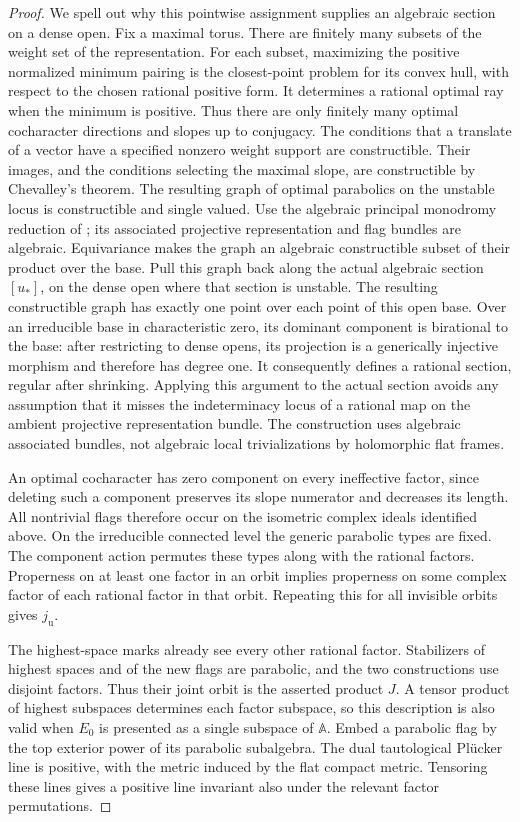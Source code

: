 \begin{proof}
We spell out why this pointwise assignment supplies an algebraic
section on a dense open.  Fix a maximal torus.  There are finitely
many subsets of the weight set of the representation.  For each
subset, maximizing the positive normalized minimum pairing is
the closest-point problem for its convex hull, with respect to
the chosen rational positive form.  It determines a rational
optimal ray when the minimum is positive.  Thus there are only
finitely many optimal cocharacter directions and slopes up to
conjugacy.  The conditions that a translate of a vector have a
specified nonzero weight support are constructible.  Their
images, and the conditions selecting the maximal slope, are
constructible by Chevalley's theorem.  The resulting graph of
optimal parabolics on the unstable locus is constructible and single
valued.  Use the algebraic principal monodromy reduction of
; its associated projective
representation and flag bundles are algebraic.  Equivariance makes the
graph an algebraic constructible subset of their product over the base.
Pull this graph back along the actual algebraic section $[u_*]$, on the
dense open where that section is unstable.  The resulting constructible
graph has exactly one point over each point of this open base.  Over an
irreducible base in characteristic zero, its dominant component is
birational to the base: after restricting to dense opens, its projection
is a generically injective morphism and therefore has degree one.
It consequently defines a rational section, regular after shrinking.
Applying this argument to the actual section avoids any assumption that
it misses the indeterminacy locus of a rational map on the ambient
projective representation bundle.  The construction uses algebraic associated
bundles, not algebraic local trivializations by holomorphic flat frames.

An optimal cocharacter has zero component on every ineffective
factor, since deleting such a component preserves its slope
numerator and decreases its length.  All nontrivial flags
therefore occur on the isometric complex ideals identified
above.  On the irreducible connected level the generic parabolic
types are fixed.  The component action permutes these types
along with the rational factors.  Properness on at least one
factor in an orbit implies properness on some complex factor of
each rational factor in that orbit.  Repeating this for all
invisible orbits gives $j_{\mathrm u}$.

The highest-space marks already see every other rational factor.
Stabilizers of highest spaces and of the new flags are parabolic,
and the two constructions use disjoint factors.  Thus their
joint orbit is the asserted product $J$.  A tensor product of
highest subspaces determines each factor subspace, so this
description is also valid when $E_0$ is presented as a single
subspace of $\mathbb A$.  Embed a parabolic flag by the top
exterior power of its parabolic subalgebra.  The dual tautological
Plücker line is positive, with the metric induced by the flat
compact metric.  Tensoring these lines gives a positive line
invariant also under the relevant factor permutations.
\end{proof}


